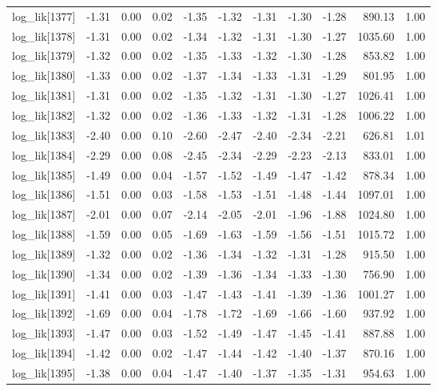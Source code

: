 \begin{table}[ht]
\begin{tabular}{rrrrrrrrrrr}
  log\_lik[1377] & -1.31 & 0.00 & 0.02 & -1.35 & -1.32 & -1.31 & -1.30 & -1.28 & 890.13 & 1.00 \\ 
  log\_lik[1378] & -1.31 & 0.00 & 0.02 & -1.34 & -1.32 & -1.31 & -1.30 & -1.27 & 1035.60 & 1.00 \\ 
  log\_lik[1379] & -1.32 & 0.00 & 0.02 & -1.35 & -1.33 & -1.32 & -1.30 & -1.28 & 853.82 & 1.00 \\ 
  log\_lik[1380] & -1.33 & 0.00 & 0.02 & -1.37 & -1.34 & -1.33 & -1.31 & -1.29 & 801.95 & 1.00 \\ 
  log\_lik[1381] & -1.31 & 0.00 & 0.02 & -1.35 & -1.32 & -1.31 & -1.30 & -1.27 & 1026.41 & 1.00 \\ 
  log\_lik[1382] & -1.32 & 0.00 & 0.02 & -1.36 & -1.33 & -1.32 & -1.31 & -1.28 & 1006.22 & 1.00 \\ 
  log\_lik[1383] & -2.40 & 0.00 & 0.10 & -2.60 & -2.47 & -2.40 & -2.34 & -2.21 & 626.81 & 1.01 \\ 
  log\_lik[1384] & -2.29 & 0.00 & 0.08 & -2.45 & -2.34 & -2.29 & -2.23 & -2.13 & 833.01 & 1.00 \\ 
  log\_lik[1385] & -1.49 & 0.00 & 0.04 & -1.57 & -1.52 & -1.49 & -1.47 & -1.42 & 878.34 & 1.00 \\ 
  log\_lik[1386] & -1.51 & 0.00 & 0.03 & -1.58 & -1.53 & -1.51 & -1.48 & -1.44 & 1097.01 & 1.00 \\ 
  log\_lik[1387] & -2.01 & 0.00 & 0.07 & -2.14 & -2.05 & -2.01 & -1.96 & -1.88 & 1024.80 & 1.00 \\ 
  log\_lik[1388] & -1.59 & 0.00 & 0.05 & -1.69 & -1.63 & -1.59 & -1.56 & -1.51 & 1015.72 & 1.00 \\ 
  log\_lik[1389] & -1.32 & 0.00 & 0.02 & -1.36 & -1.34 & -1.32 & -1.31 & -1.28 & 915.50 & 1.00 \\ 
  log\_lik[1390] & -1.34 & 0.00 & 0.02 & -1.39 & -1.36 & -1.34 & -1.33 & -1.30 & 756.90 & 1.00 \\ 
  log\_lik[1391] & -1.41 & 0.00 & 0.03 & -1.47 & -1.43 & -1.41 & -1.39 & -1.36 & 1001.27 & 1.00 \\ 
  log\_lik[1392] & -1.69 & 0.00 & 0.04 & -1.78 & -1.72 & -1.69 & -1.66 & -1.60 & 937.92 & 1.00 \\ 
  log\_lik[1393] & -1.47 & 0.00 & 0.03 & -1.52 & -1.49 & -1.47 & -1.45 & -1.41 & 887.88 & 1.00 \\ 
  log\_lik[1394] & -1.42 & 0.00 & 0.02 & -1.47 & -1.44 & -1.42 & -1.40 & -1.37 & 870.16 & 1.00 \\ 
  log\_lik[1395] & -1.38 & 0.00 & 0.04 & -1.47 & -1.40 & -1.37 & -1.35 & -1.31 & 954.63 & 1.00 \\ 

\end{tabular}
\end{table}
